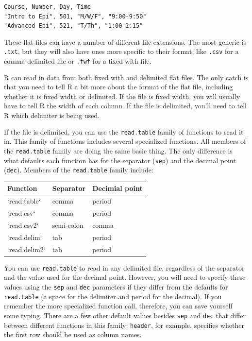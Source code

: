 \documentclass[]{book}
\begin{document}
\begin{verbatim}
Course, Number, Day, Time
"Intro to Epi", 501, "M/W/F", "9:00-9:50"
"Advanced Epi", 521, "T/Th", "1:00-2:15"
\end{verbatim}

These flat files can have a number of different file extensions. The
most generic is \texttt{.txt}, but they will also have ones more
specific to their format, like \texttt{.csv} for a comma-delimited file
or \texttt{.fwf} for a fixed with file.

R can read in data from both fixed with and delimited flat files. The
only catch is that you need to tell R a bit more about the format of the
flat file, including whether it is fixed width or delimited. If the file
is fixed width, you will usually have to tell R the width of each
column. If the file is delimited, you'll need to tell R which delimiter
is being used.

If the file is delimited, you can use the \texttt{read.table} family of
functions to read it in. This family of functions includes several
specialized functions. All members of the \texttt{read.table} family are
doing the same basic thing. The only difference is what defaults each
function has for the separator (\texttt{sep}) and the decimal point
(\texttt{dec}). Members of the \texttt{read.table} family include:

\begin{tabular}{l|l|l}
\hline
Function & Separator & Decimial point\\
\hline
`read.table` & comma & period\\
\hline
`read.csv` & comma & period\\
\hline
`read.csv2` & semi-colon & comma\\
\hline
`read.delim` & tab & period\\
\hline
`read.delim2` & tab & period\\
\hline
\end{tabular}

You can use \texttt{read.table} to read in any delimited file,
regardless of the separator and the value used for the decimal point.
However, you will need to specify these values using the \texttt{sep}
and \texttt{dec} parameters if they differ from the defaults for
\texttt{read.table} (a space for the delimiter and period for the
decimal). If you remember the more specialized function call, therefore,
you can save yourself some typing. There are a few other default values
besides \texttt{sep} and \texttt{dec} that differ between different
functions in this family: \texttt{header}, for example, specifies
whether the first row should be used as column names.
\end{document}
